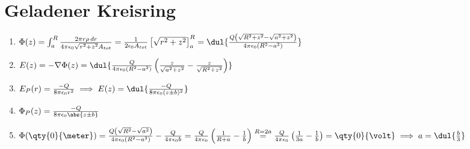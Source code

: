 \documentclass{article}
\begin{document}
\section{Geladener Kreisring}
\begin{enumerate}[label=\alph*)]
    \item $\Phi(z) = \int_{a}^{R} \frac{2\pi r \rho \, dr}{4 \pi \epsilon_0 \sqrt{r^2 + z^2} A_{tot}} 
    = \frac{1}{2 \epsilon_0 A_{tot}} \left[\sqrt{r^2 + z^2} \right]_{a}^{R}
    = \dul{\frac{Q \left(\sqrt{R^2 + z^2} - \sqrt{a^2 + z^2}\right)}{4 \pi \epsilon_0 (R^2 - a^2)}}$

    \item $E(z) = -\nabla \Phi(z) 
    = \dul{\frac{Q}{4 \pi \epsilon_0 (R^2 - a^2)} \left(\frac{z}{\sqrt{a^2 + z^2}} - \frac{z}{\sqrt{R^2 + z^2}} \right)}$
    
    \item $E_P(r) = \frac{-Q}{8 \pi \epsilon_0 r^2} \implies E(z) = \dul{\frac{-Q}{8 \pi \epsilon_0 (z \pm b)^2}}$
    
    \item $\Phi_P(z) = \frac{-Q}{8 \pi \epsilon_0 \abs{z \pm b}}$
    
    \item $\Phi(\qty{0}{\meter}) = \frac{Q \left(\sqrt{R^2} - \sqrt{a^2}\right)}{4 \pi \epsilon_0 (R^2 - a^2)} - \frac{Q}{4 \pi \epsilon_0 b}
    = \frac{Q}{4 \pi \epsilon_0} \left(\frac{1}{R + a} - \frac{1}{b}\right) \stackrel{R = 2a}{=} \frac{Q}{4 \pi \epsilon_0} \left(\frac{1}{3a} - \frac{1}{b}\right) = \qty{0}{\volt}
    \implies a = \dul{\frac{b}{3}}$ 
\end{enumerate}
\end{document}
